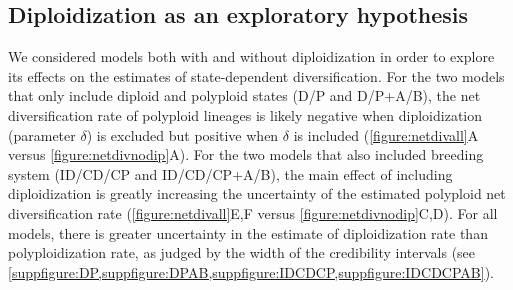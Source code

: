 \subsection{Diploidization as an exploratory hypothesis}

We considered models both with and without diploidization in order to explore its effects on the estimates of state-dependent diversification.
For the two models that only include diploid and polyploid states (D/P and D/P+A/B), the net diversification rate of polyploid lineages is likely negative when diploidization (parameter $\delta$) is excluded but positive when $\delta$ is included (\cref{figure:netdivall}A versus \cref{figure:netdivnodip}A).
For the two models that also included breeding system (ID/CD/CP and ID/CD/CP+A/B), the main effect of including diploidization is greatly increasing the uncertainty of the estimated polyploid net diversification rate (\cref{figure:netdivall}E,F versus \cref{figure:netdivnodip}C,D).
For all models, there is greater uncertainty in the estimate of diploidization rate than polyploidization rate, as judged by the width of the credibility intervals (see \cref{suppfigure:DP,suppfigure:DPAB,suppfigure:IDCDCP,suppfigure:IDCDCPAB}).

